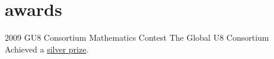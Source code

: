 \documentclass[]{friggeri-cv}  %
\begin{document}

\section{awards}

\begin{entrylist}

    \entry
    {2009}
    {GU8 Consortium Mathematics Contest}
    {The Global U8 Consortium}
    {Achieved a \href{http://www.tomgurion.me/pdfs/U8 mathematic contest - silver prize.pdf}{silver prize}.}

\end{entrylist}
\end{document}
